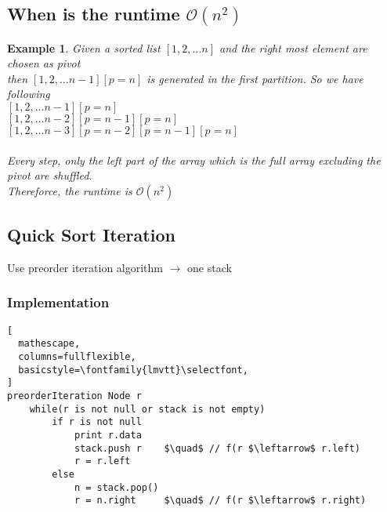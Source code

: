 \documentclass{article}
\newtheorem{example}{Example}
\newcommand{\arr}{\rightarrow}
\begin{document}
\subsection{When is the runtime $\mathcal{O}(n^2)$}
\begin{example}
Given a sorted list $[1, 2, \dots n]$ and the right most element are chosen as pivot \\
then $[1, 2,\dots n-1][p=n]$ is generated in the first partition. So we have following \\
$[1, 2, \dots n-1][p=n]$ \\
$[1, 2, \dots n-2][p=n-1][p=n]$ \\
$[1, 2, \dots n-3][p=n-2][p=n-1][p=n]$ \\ \\
Every step, only the left part of the array which is the full array excluding the pivot are shuffled. \\
Thereforce, the runtime is $\mathcal{O}(n^2)$

\end{example}

\subsection{Quick Sort Iteration}
Use preorder iteration algorithm $\arr$ one stack

\subsubsection{Implementation} 

\begin{lstlisting}[
  mathescape,
  columns=fullflexible,
  basicstyle=\fontfamily{lmvtt}\selectfont,
]
preorderIteration Node r
    while(r is not null or stack is not empty) 
        if r is not null
            print r.data
            stack.push r    $\quad$ // f(r $\leftarrow$ r.left)
            r = r.left
        else
            n = stack.pop()
            r = n.right     $\quad$ // f(r $\leftarrow$ r.right)
\end{lstlisting}
\end{document}
